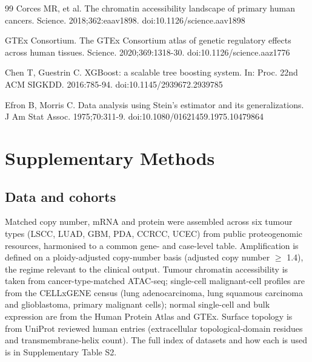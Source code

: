 \documentclass[times, twoside]{zHenriquesLab-StyleBioRxiv}
\begin{document}
\begin{thebibliography}{99}
 Corces MR, et al. The chromatin accessibility landscape of primary human cancers. Science. 2018;362:eaav1898. doi:10.1126/science.aav1898

 GTEx Consortium. The GTEx Consortium atlas of genetic regulatory effects across human tissues. Science. 2020;369:1318-30. doi:10.1126/science.aaz1776

 Chen T, Guestrin C. XGBoost: a scalable tree boosting system. In: Proc. 22nd ACM SIGKDD. 2016:785-94. doi:10.1145/2939672.2939785

 Efron B, Morris C. Data analysis using Stein's estimator and its generalizations. J Am Stat Assoc. 1975;70:311-9. doi:10.1080/01621459.1975.10479864

\end{thebibliography}

\onecolumn
\newpage

\setcounter{figure}{0}
\setcounter{table}{0}
\renewcommand{\thefigure}{S\arabic{figure}}
\renewcommand{\thetable}{S\arabic{table}}

\section*{Supplementary Methods}

\subsection*{Data and cohorts}
Matched copy number, mRNA and protein were assembled across six tumour types (LSCC, LUAD, GBM, PDA, CCRCC, UCEC) from public proteogenomic resources\cite{ref14,ref15}, harmonised to a common gene- and case-level table. Amplification is defined on a ploidy-adjusted copy-number basis (adjusted copy number $\geq$ 1.4), the regime relevant to the clinical output. Tumour chromatin accessibility is taken from cancer-type-matched ATAC-seq\cite{ref25}; single-cell malignant-cell profiles are from the CELLxGENE census\cite{ref21} (lung adenocarcinoma, lung squamous carcinoma and glioblastoma, primary malignant cells); normal single-cell and bulk expression are from the Human Protein Atlas\cite{ref22,ref23} and GTEx\cite{ref26}. Surface topology is from UniProt reviewed human entries\cite{ref19} (extracellular topological-domain residues and transmembrane-helix count). The full index of datasets and how each is used is in Supplementary Table S2.
\end{document}
